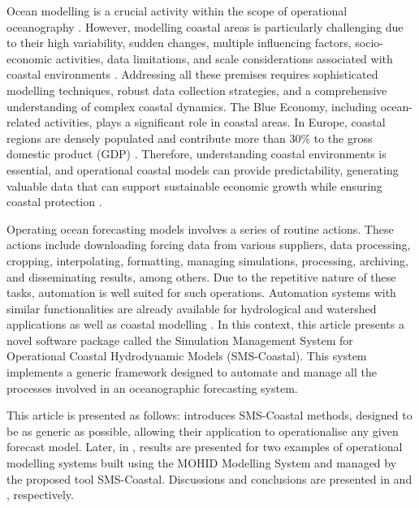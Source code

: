 Ocean modelling is a crucial activity within the scope of operational oceanography \parencite{capet2020operational}. However, modelling coastal areas is particularly challenging due to their high variability, sudden changes, multiple influencing factors, socio-economic activities, data limitations, and scale considerations associated with coastal environments \parencite{she2016developing}. Addressing all these premises requires sophisticated modelling techniques, robust data collection strategies, and a comprehensive understanding of complex coastal dynamics. The Blue Economy, including ocean-related activities, plays a significant role in coastal areas. In Europe, coastal regions are densely populated and contribute more than 30\% to the gross domestic product (GDP) \parencite{she2014analysis}. Therefore, understanding coastal environments is essential, and operational coastal models can provide predictability, generating valuable data that can support sustainable economic growth while ensuring coastal protection \parencite{capet2020operational}.

Operating ocean forecasting models involves a series of routine actions. These actions include downloading forcing data from various suppliers, data processing, cropping, interpolating, formatting, managing simulations, processing, archiving, and disseminating results, among others. Due to the repetitive nature of these tasks, automation is well suited for such operations. Automation systems with similar functionalities are already available for hydrological and watershed applications \parencite{brendel2020integration, lodhi2020urunme, zeng2020development} as well as coastal modelling \parencite{bever2021real, oliveira2020opencoasts, oliveira2021forecasting}. In this context, this article presents a novel software package called the Simulation Management System for Operational Coastal Hydrodynamic Models (SMS-Coastal). This system implements a generic framework designed to automate and manage all the processes involved in an oceanographic forecasting system.

This article is presented as follows:  introduces SMS-Coastal methods, designed to be as generic as possible, allowing their application to operationalise any given forecast model. Later, in , results are presented for two examples of operational modelling systems built using the MOHID Modelling System and managed by the proposed tool SMS-Coastal. Discussions and conclusions are presented in  and , respectively.

